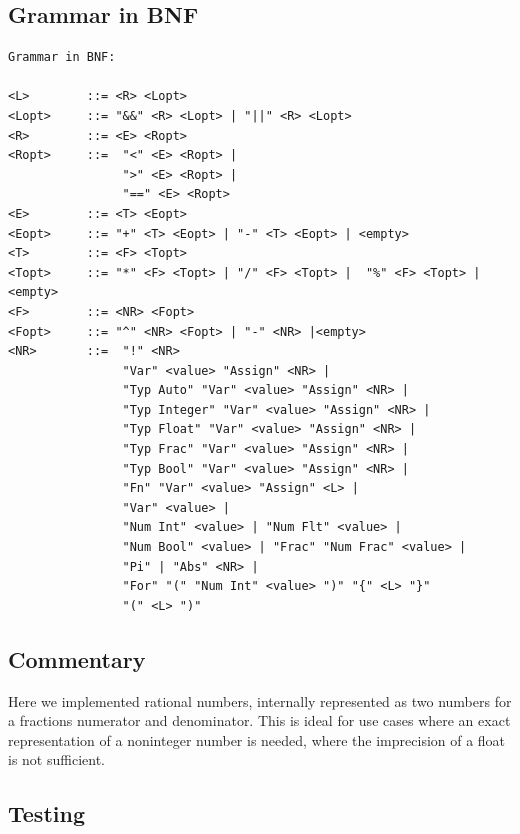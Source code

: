 \documentclass[a4paper, oneside, 11pt]{report}
\begin{document}
    \subsection{Grammar in BNF}
    \begin{verbatim}
Grammar in BNF:

<L>        ::= <R> <Lopt>
<Lopt>     ::= "&&" <R> <Lopt> | "||" <R> <Lopt>
<R>        ::= <E> <Ropt>
<Ropt>     ::=  "<" <E> <Ropt> |
                ">" <E> <Ropt> |
                "==" <E> <Ropt>
<E>        ::= <T> <Eopt>
<Eopt>     ::= "+" <T> <Eopt> | "-" <T> <Eopt> | <empty>
<T>        ::= <F> <Topt>
<Topt>     ::= "*" <F> <Topt> | "/" <F> <Topt> |  "%" <F> <Topt> |<empty>
<F>        ::= <NR> <Fopt>
<Fopt>     ::= "^" <NR> <Fopt> | "-" <NR> |<empty>
<NR>       ::=  "!" <NR>
                "Var" <value> "Assign" <NR> |
                "Typ Auto" "Var" <value> "Assign" <NR> |
                "Typ Integer" "Var" <value> "Assign" <NR> |
                "Typ Float" "Var" <value> "Assign" <NR> |
                "Typ Frac" "Var" <value> "Assign" <NR> |
                "Typ Bool" "Var" <value> "Assign" <NR> |
                "Fn" "Var" <value> "Assign" <L> |
                "Var" <value> |
                "Num Int" <value> | "Num Flt" <value> |
                "Num Bool" <value> | "Frac" "Num Frac" <value> |
                "Pi" | "Abs" <NR> |
                "For" "(" "Num Int" <value> ")" "{" <L> "}"
                "(" <L> ")"

    \end{verbatim}
    \subsection{Commentary}
    Here we implemented rational numbers, internally represented as two numbers for a fractions numerator and denominator. This is ideal for use cases where an exact representation of a noninteger number is needed, where the imprecision of a float is not sufficient.

    \subsection{Testing}
\end{document}

